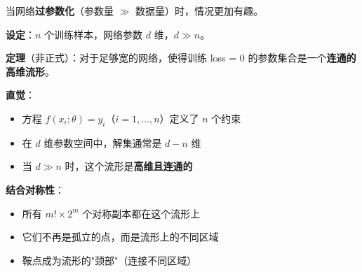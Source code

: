 \documentclass[12pt, a4paper]{ctexart}
\begin{document}
当网络\textbf{过参数化}（参数量 $\gg$ 数据量）时，情况更加有趣。

\begin{blackboard}

\textbf{设定}：$n$ 个训练样本，网络参数 $d$ 维，$d \gg n$。

\textbf{定理}（非正式）：对于足够宽的网络，使得训练 loss = 0 的参数集合是一个\textbf{连通的高维流形}。

\textbf{直觉}：
\begin{itemize}
    \item 方程 $f(x_i; \theta) = y_i$（$i = 1, \ldots, n$）定义了 $n$ 个约束
    \item 在 $d$ 维参数空间中，解集通常是 $d - n$ 维
    \item 当 $d \gg n$ 时，这个流形是\textbf{高维且连通的}
\end{itemize}

\textbf{结合对称性}：
\begin{itemize}
    \item 所有 $m! \times 2^m$ 个对称副本都在这个流形上
    \item 它们不再是孤立的点，而是流形上的不同区域
    \item 鞍点成为流形的"颈部"（连接不同区域）
\end{itemize}

\end{blackboard}
\end{document}

